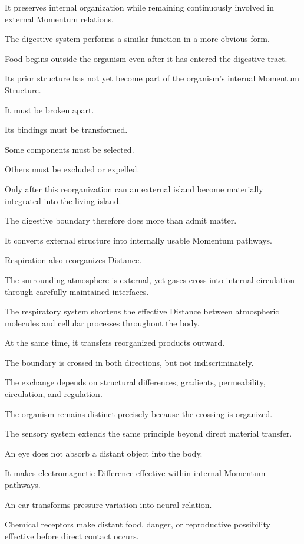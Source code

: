 It preserves internal organization while remaining continuously involved in external Momentum relations.

The digestive system performs a similar function in a more obvious form.

Food begins outside the organism even after it has entered the digestive tract.

Its prior structure has not yet become part of the organism’s internal Momentum Structure.

It must be broken apart.

Its bindings must be transformed.

Some components must be selected.

Others must be excluded or expelled.

Only after this reorganization can an external island become materially integrated into the living island.

The digestive boundary therefore does more than admit matter.

It converts external structure into internally usable Momentum pathways.

Respiration also reorganizes Distance.

The surrounding atmosphere is external, yet gases cross into internal circulation through carefully maintained interfaces.

The respiratory system shortens the effective Distance between atmospheric molecules and cellular processes throughout the body.

At the same time, it transfers reorganized products outward.

The boundary is crossed in both directions, but not indiscriminately.

The exchange depends on structural differences, gradients, permeability, circulation, and regulation.

The organism remains distinct precisely because the crossing is organized.

The sensory system extends the same principle beyond direct material transfer.

An eye does not absorb a distant object into the body.

It makes electromagnetic Difference effective within internal Momentum pathways.

An ear transforms pressure variation into neural relation.

Chemical receptors make distant food, danger, or reproductive possibility effective before direct contact occurs.

